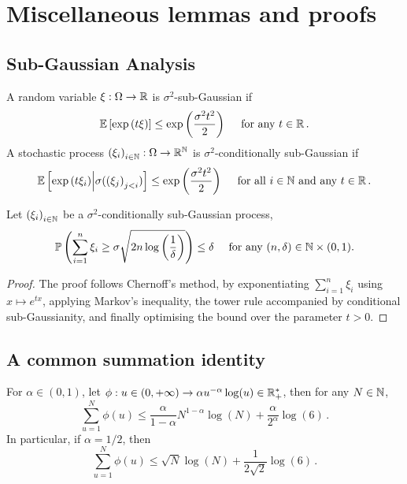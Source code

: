 \section{Miscellaneous lemmas and proofs}\label{app: lemmas}

\subsection{Sub-Gaussian Analysis}\label{app: sub-gaussian}

\begin{definition}\label{def: sub-G}
    A random variable $\xi:\Omega\to\mathbb{R}$ is $\sigma^2$-sub-Gaussian if
    \[
        \mathbb{E}\left[\exp\left(t\xi\right)\right]\leq\exp\left(\frac{\sigma^2t^2}{2}\right) \quad\mbox{ for any } t\in\mathbb{R}\,.
    \]
    A stochastic process ${(\xi_i)}_{i\in\mathbb{N}}:\Omega\to \mathbb{R}^{\mathbb{N}}$ is $\sigma^2$-conditionally sub-Gaussian if
    \[
        \mathbb{E}\left[\exp\left(t\xi_i\right)\middle|\sigma({(\xi_j)}_{j<i})\right]\leq\exp\left(\frac{\sigma^2t^2}{2}\right)\quad \mbox{ for all } i\in\mathbb{N} \mbox{ and any } t\in\mathbb{R}\,.
    \]
\end{definition}

\begin{lemma}\label{lemma: sub-gaussian sum}
    Let ${(\xi_i)}_{i\in\mathbb{N}}$ be a $\sigma^2$-conditionally sub-Gaussian process, 
    \[ 
        \mathbb{P}\left(\sum_{i=1}^n \xi_i \ge \sigma\sqrt{2n\log\left(\frac 1\delta\right)}\right)\le \delta \quad\mbox{ for any }(n,\delta)\in\mathbb{N}\times(0,1).
    \]
\end{lemma}
\begin{proof}
    The proof follows Chernoff's method, by exponentiating $\sum_{i=1}^n\xi_i$ using $x\mapsto e^{tx}$, applying Markov's inequality, the tower rule accompanied by conditional sub-Gaussianity, and finally optimising the bound over the parameter $t>0$. 
\end{proof}




\subsection{A common summation identity}

\begin{lemma}\label{lemma: sum of terms from pegon bound}
    For $\alpha\in(0,1)$, let $\phi:u\in(0,+\infty)\to \alpha u^{-\alpha}\log(u)\in\mathbb{R}_+^*$, then for any $N\in\mathbb{N}$,
    \[
        \sum_{u=1}^N \phi(u)\le \frac{\alpha}{1-\alpha}N^{1-\alpha}\log(N) +\frac{\alpha}{2^{\alpha}}\log(6)\,.
    \]
    In particular, if $\alpha=1/2$, then 
    \[ 
        \sum_{u=1}^N \phi(u)\le\sqrt{N}\log(N)+\frac{1}{2\sqrt{2}}\log(6)\,.
    \]
\end{lemma}

